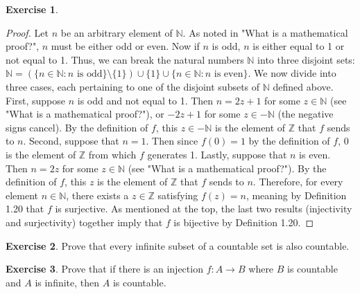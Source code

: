 \documentclass[titlepage]{article}
\newcounter{script}
\theoremstyle{definition}
\newtheorem{exercise}{Exercise}[script]
\newcommand{\N}{\mathbb{N}}
\newcommand{\Z}{\mathbb{Z}}
\begin{document}
\begin{exercise}
\begin{proof}
        Let $n$ be an arbitrary element of $\N$. As noted in "What is a mathematical proof?", $n$ must be either odd or even. Now if $n$ is odd, $n$ is either equal to 1 or not equal to 1. Thus, we can break the natural numbers $\N$ into three disjoint sets: $\N=(\{n\in\N:n\text{ is odd}\}\setminus\{1\})\cup\{1\}\cup\{n\in\N:n\text{ is even}\}$. We now divide into three cases, each pertaining to one of the disjoint subsets of $\N$ defined above. First, suppose $n$ is odd and not equal to 1. Then $n=2z+1$ for some $z\in\N$ (see "What is a mathematical proof?"), or $-2z+1$ for some $z\in-\N$ (the negative signs cancel). By the definition of $f$, this $z\in-\N$ is the element of $\Z$ that $f$ sends to $n$. Second, suppose that $n=1$. Then since $f(0)=1$ by the definition of $f$, 0 is the element of $\Z$ from which $f$ generates 1. Lastly, suppose that $n$ is even. Then $n=2z$ for some $z\in\N$ (see "What is a mathematical proof?"). By the definition of $f$, this $z$ is the element of $\Z$ that $f$ sends to $n$. Therefore, for every element $n\in\N$, there exists a $z\in\Z$ satisfying $f(z)=n$, meaning by Definition 1.20 that $f$ is surjective. As mentioned at the top, the last two results (injectivity and surjectivity) together imply that $f$ is bijective by Definition 1.20.
    \end{proof}
\end{exercise}

\begin{exercise}
    Prove that every infinite subset of a countable set is also countable.
\end{exercise}

\begin{exercise}
    Prove that if there is an injection $f:A\to B$ where $B$ is countable and $A$ is infinite, then $A$ is countable.
\end{exercise}
\newpage



\setcounter{secnumdepth}{0}
\end{document}
